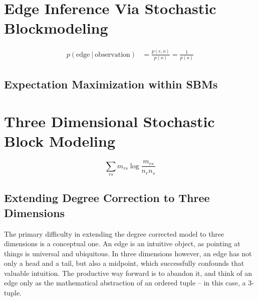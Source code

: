 \documentclass[11pt]{scrartcl}
\begin{document}
\section{Edge Inference Via Stochastic Blockmodeling}


\begin{align}
p( \text{edge} \:|\: \text{observation}) &= \frac{p(e, o)}{p(o)} = \frac{1}{p(o)}
\end{align}


\subsection{Expectation Maximization within SBMs}





\section{Three Dimensional Stochastic Block Modeling}

\[
\sum_{rs} m_{rs} \log \frac{m_{rs}}{n_r n_s}
\]

\subsection{Extending Degree Correction to Three Dimensions}

The primary difficulty in extending the degree corrected model to three dimensions is a conceptual one. An edge is an intuitive object, as pointing at things is universal and ubiquitous. In three dimensions however, an edge has not only a head and a tail, but also a midpoint, which successfully confounds that valuable intuition. The productive way forward is to abandon it, and think of an edge only as the mathematical abstraction of an ordered tuple -- in this case, a 3-tuple. 
\end{document}
